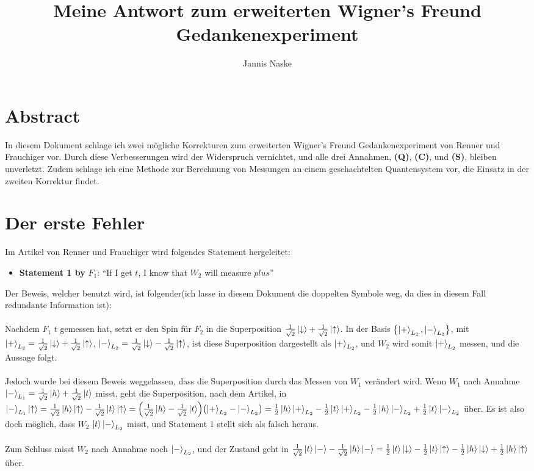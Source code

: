 \documentclass[a4paper]{article}
\title{Meine Antwort zum erweiterten Wigner's Freund Gedankenexperiment}
\author{Jannis Naske}
\begin{document}
\maketitle

\section*{Abstract}
In diesem Dokument schlage ich zwei mögliche Korrekturen zum erweiterten Wigner's Freund Gedankenexperiment von Renner und Frauchiger vor.
Durch diese Verbesserungen wird der Widerspruch vernichtet, und alle drei Annahmen, \textbf{(Q)}, \textbf{(C)}, und \textbf{(S)}, bleiben unverletzt.
Zudem schlage ich eine Methode zur Berechnung von Messungen an einem geschachtelten Quantensystem vor, die Einsatz in der zweiten Korrektur findet.

\section*{Der erste Fehler}
Im Artikel von Renner und Frauchiger wird folgendes Statement hergeleitet:
\begin{itemize}
	\item \textbf{Statement 1 by} $F_1$: ``If I get $t$, I know that $W_2$ will measure $plus$''
\end{itemize}
Der Beweis, welcher benutzt wird, ist folgender(ich lasse in diesem Dokument die doppelten Symbole weg, da dies in diesem Fall redundante Information ist):\\\\
Nachdem $F_1$ $t$ gemessen hat, setzt er den Spin für $F_2$ in die Superposition $\frac{1}{\sqrt{2}} \ket{\downarrow} + \frac{1}{\sqrt{2}} \ket{\uparrow}$.
In der Basis $\qty{\ket{+}_{L_2}, \ket{-}_{L_2}}$, mit $\ket{+}_{L_2} = \frac{1}{\sqrt{2}} \ket{\downarrow} + \frac{1}{\sqrt{2}} \ket{\uparrow}$, $\ket{-}_{L_2} = \frac{1}{\sqrt{2}} \ket{\downarrow} - \frac{1}{\sqrt{2}} \ket{\uparrow}$,
ist diese Superposition dargestellt als $\ket{+}_{L_2}$, und $W_2$ wird somit $\ket{+}_{L_2}$ messen, und die Aussage folgt.\\\\
Jedoch wurde bei diesem Beweis weggelassen, dass die Superposition durch das Messen von $W_1$ verändert wird.
Wenn $W_1$ nach Annahme $\ket{-}_{L_1} = \frac{1}{\sqrt{2}}\ket{h} + \frac{1}{\sqrt{2}}\ket{t}$ misst, geht die Superposition, nach dem Artikel,
in $\ket{-}_{L_1}\ket{\uparrow} = \frac{1}{\sqrt{2}}\ket{h}\ket{\uparrow} - \frac{1}{\sqrt{2}}\ket{t}\ket{\uparrow} = \qty(\frac{1}{\sqrt{2}} \ket{h} - \frac{1}{\sqrt{2}} \ket{t})\qty(\ket{+}_{L_2} - \ket{-}_{L_2}) = \frac{1}{2}\ket{h}\ket{+}_{L_2} - \frac{1}{2}\ket{t}\ket{+}_{L_2} - \frac{1}{2}\ket{h}\ket{-}_{L_2} + \frac{1}{2}\ket{t}\ket{-}_{L_2}$ über. Es ist also doch möglich, dass $W_2$ $\ket{t}\ket{-}_{L_2}$ misst, und Statement 1 stellt sich als falsch heraus.\\\\
Zum Schluss misst $W_2$ nach Annahme noch $\ket{-}_{L_2}$, und der Zustand geht in $\frac{1}{\sqrt{2}}\ket{t}\ket{-} - \frac{1}{\sqrt{2}}\ket{h}\ket{-} = \frac{1}{2}\ket{t}\ket{\downarrow} - \frac{1}{2}\ket{t}\ket{\uparrow} - \frac{1}{2}\ket{h}\ket{\downarrow} + \frac{1}{2}\ket{h}\ket{\uparrow}$ über.
\end{document}
